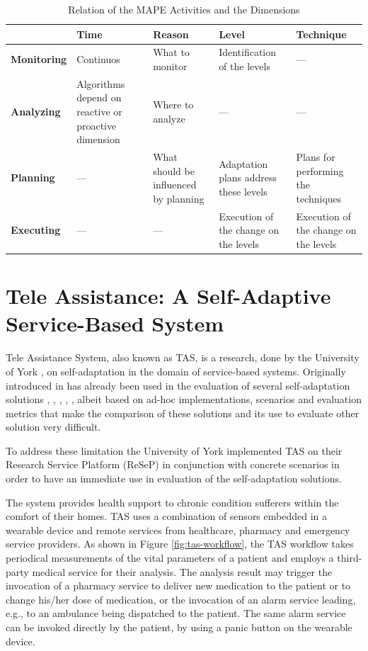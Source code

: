 \begin{table}[ht!b]
	\centering
	\begin{tabular}{|l||p{2.4cm}|p{2.4cm}|p{2.4cm}|p{2.4cm}|}
		\hline 
		& \textbf{Time} & \textbf{Reason} & \textbf{Level} & \textbf{Technique} \\ 
		\hline 
		\textbf{Monitoring} & Continuos & What to monitor & Identification of the levels & --- \\ 
		\hline 
		\textbf{Analyzing} & Algorithms depend on reactive or proactive dimension & Where to analyze & --- & --- \\ 
		\hline 
		\textbf{Planning} & --- & What should be influenced by planning & Adaptation plans address these levels & Plans for performing the techniques \\ 
		\hline 
		\textbf{Executing} & --- & --- & Execution of the change on the levels & Execution of the change on the levels \\ 
		\hline 
	
	\end{tabular} 
\caption[MAPE and Dimensions]{Relation of the MAPE Activities and the Dimensions}
\label{tab:mape}
\end{table}

\section{Tele Assistance: A Self-Adaptive Service-Based System}
Tele Assistance System, also known as TAS, is a research, done by the University of York \cite{teleassist}, on self-adaptation in the domain of service-based systems. Originally introduced in \cite{valid-web-serv} has already been used in the evaluation of several self-adaptation solutions \cite{valid-web-serv}, \cite{sas-quant-ver}, \cite{dyn-qos-manage}, \cite{mod-evo-conf}, \cite{conq-compl}, albeit based on ad-hoc implementations, scenarios and evaluation metrics that make the comparison of these solutions and its use to evaluate other solution very difficult.

To address these limitation the University of York implemented TAS on their Research Service Platform (ReSeP) in conjunction with concrete scenarios in order to have an immediate use in evaluation of the self-adaptation solutions.

The system provides health support to chronic condition sufferers within the comfort of their homes. TAS uses a combination of sensors embedded in a wearable device and remote services from healthcare, pharmacy and emergency service providers. As shown in Figure \ref{fig:tas-workflow}, the TAS workflow takes periodical measurements of the vital parameters of a patient and employs a third-party medical service for their analysis. The analysis result may trigger the invocation of a pharmacy service to deliver new medication to the patient or to change his/her dose of medication, or the invocation of an alarm service leading, e.g., to an ambulance being dispatched to the patient. The same alarm service can be invoked directly by the patient, by using a panic button on the wearable device.

